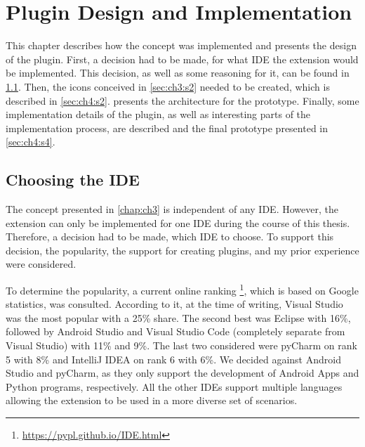 
\chapter{Plugin Design and Implementation}
\label{chap:ch4}
This chapter describes how the concept was implemented and presents the design of the plugin.
First, a decision had to be made, for what \gls{IDE} the extension would be implemented.
This decision, as well as some reasoning for it, can be found in \cref{sec:ch4:s1}.
Then, the icons conceived in \cref{sec:ch3:s2} needed to be created, which is described in \cref{sec:ch4:s2}.
 presents the architecture for the prototype.
Finally, some implementation details of the plugin, as well as interesting parts of the implementation process, are described 
and the final prototype presented in \cref{sec:ch4:s4}.

\section{Choosing the IDE}
\label{sec:ch4:s1}
The concept presented in \cref{chap:ch3} is independent of any \gls{IDE}.
However, the extension can only be implemented for one \gls{IDE} during the course of this thesis.
Therefore, a decision had to be made, which \gls{IDE} to choose.
To support this decision, the popularity, the support for creating plugins, and my prior experience were considered.

To determine the popularity, a current online ranking \footnote{\url{https://pypl.github.io/IDE.html}}, which is based on Google statistics, was consulted.
According to it, at the time of writing, Visual Studio was the most popular with a 25\% share.
The second best was \gls{Eclipse} with 16\%, followed by Android Studio and Visual Studio Code (completely separate from Visual Studio) with 11\% and 9\%.
The last two considered were pyCharm on rank 5 with 8\% and IntelliJ IDEA on rank 6 with 6\%.
We decided against Android Studio and pyCharm, as they only support the development of Android Apps and Python programs, respectively.
All the other \glspl{IDE} support multiple languages allowing the extension to be used in a more diverse set of scenarios.

